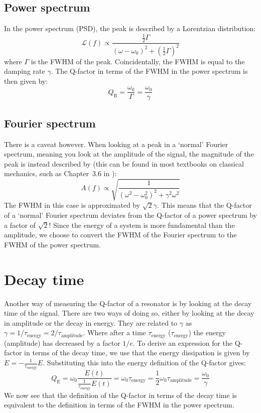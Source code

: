 \subsection{Power spectrum}
In the power spectrum (PSD), the peak is described by a Lorentzian distribution:
\begin{equation}
    \mathcal{L}(f) \propto \frac{\frac{1}{2} \Gamma}{(\omega - \omega_0)^2 + \left(\frac{1}{2} \Gamma\right)^2}
\end{equation}
where $\Gamma$ is the FWHM of the peak. Coincidentally, the FWHM is equal to the damping rate $\gamma$. The Q-factor in terms of the FWHM in the power spectrum is then given by:
\begin{equation}
    Q_\text{B} = \frac{\omega_0}{\Gamma} = \frac{\omega_0}{\gamma}
\end{equation}

\subsection{Fourier spectrum}
There is a caveat however. When looking at a peak in a `normal' Fourier spectrum, meaning you look at the amplitude of the signal, the magnitude of the peak is instead described by (this can be found in most textbooks on classical mechanics, such as Chapter~3.6 in \citeauthor{fowles_analytical_2005}):
\begin{equation}
    A(f) \propto \sqrt{\frac{1}{(\omega^2 - \omega_0^2)^2 + \gamma^2\omega^2}}
\end{equation}
The FWHM in this case is approximated by $\sqrt{2}\gamma$. This means that the Q-factor of a `normal' Fourier spectrum deviates from the Q-factor of a power spectrum by a factor of $\sqrt{2}$! Since the energy of a system is more fundamental than the amplitude, we choose to convert the FWHM of the Fourier spectrum to the FWHM of the power spectrum.

\section{Decay time}
Another way of measuring the Q-factor of a resonator is by looking at the decay time of the signal. There are two ways of doing so, either by looking at the decay in amplitude or the decay in energy. They are related to $\gamma$ as $\gamma = 1 / \tau_\text{energy} = 2 / \tau_\text{amplitude}$. Where after a time $\tau_\text{energy}$ ($\tau_\text{energy}$) the energy (amplitude) has decreased by a factor $1/e$. To derive an expression for the Q-factor in terms of the decay time, we use that the energy dissipation is given by $\dot{E} = -\frac{1}{\tau_\text{energy}}E$. Substituting this into the energy definition of the Q-factor gives:
\begin{equation}
    Q_\text{E} = \omega_0 \frac{E(t)}{\frac{1}{\tau_\text{energy}} E(t)} = \omega_0 \tau_\text{energy} = \frac{1}{2} \omega_0 \tau_\text{amplitude} = \frac{\omega_0}{\gamma}
\end{equation}
We now see that the definition of the Q-factor in terms of the decay time is equivalent to the definition in terms of the FWHM in the power spectrum.

